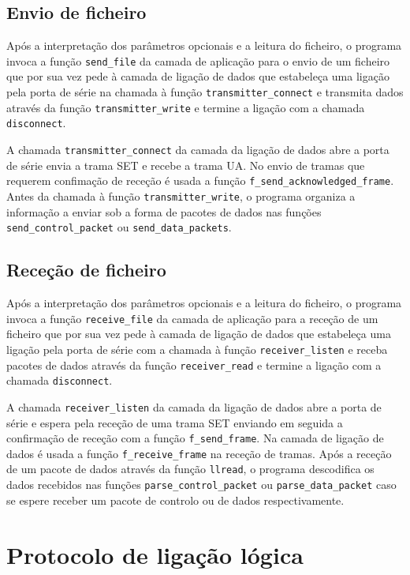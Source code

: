 \documentclass[a4paper,11pt,titlepage]{article}
\begin{document}
\subsection*{Envio de ficheiro}
Após a interpretação dos parâmetros opcionais e a leitura do ficheiro, o programa invoca a função \texttt{send\_file} da camada de aplicação para o envio de um ficheiro que por sua vez pede à camada de ligação de dados que estabeleça uma ligação pela porta de série na chamada à função \texttt{transmitter\_connect} e transmita dados através da função \texttt{transmitter\_write} e termine a ligação com a chamada \texttt{disconnect}.

A chamada \texttt{transmitter\_connect} da camada da ligação de dados abre a porta de série envia a trama SET e recebe a trama UA. No envio de tramas que requerem confimação de receção é usada a função \texttt{f\_send\_acknowledged\_frame}. Antes da chamada à função \texttt{transmitter\_write}, o programa organiza a informação a enviar sob a forma de pacotes de dados nas funções \texttt{send\_control\_packet} ou \texttt{send\_data\_packets}.

\subsection*{Receção de ficheiro}
Após a interpretação dos parâmetros opcionais e a leitura do ficheiro, o programa invoca a função \texttt{receive\_file} da camada de aplicação para a receção de um ficheiro que por sua vez pede à camada de ligação de dados que estabeleça uma ligação pela porta de série com a chamada à função \texttt{receiver\_listen} e receba pacotes de dados através da função \texttt{receiver\_read} e termine a ligação com a chamada \texttt{disconnect}.

A chamada \texttt{receiver\_listen} da camada da ligação de dados abre a porta de série e espera pela receção de uma trama SET enviando em seguida a confirmação de receção com a função \texttt{f\_send\_frame}. Na camada de ligação de dados é usada a função \texttt{f\_receive\_frame} na receção de tramas. Após a receção de um pacote de dados através da função \texttt{llread}, o programa descodifica os dados recebidos nas funções \texttt{parse\_control\_packet} ou \texttt{parse\_data\_packet} caso se espere receber um pacote de controlo ou de dados respectivamente.

\section{Protocolo de ligação lógica}

\end{document}
